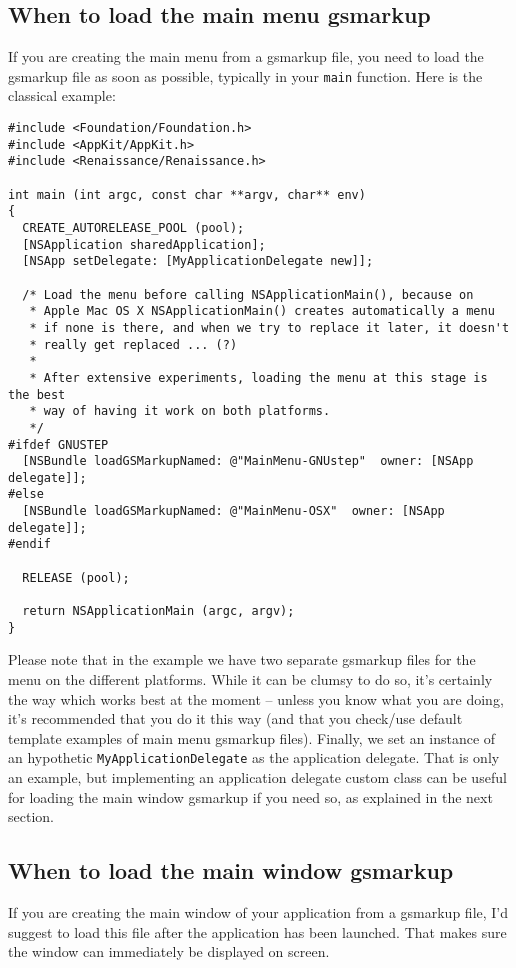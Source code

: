 \subsection{When to load the main menu gsmarkup}\label{integrating-renaissance-menu}
If you are creating the main menu from a gsmarkup file, you need to
load the gsmarkup file as soon as possible, typically in your
\texttt{main} function.  Here is the classical example:
\begin{verbatim}
#include <Foundation/Foundation.h>
#include <AppKit/AppKit.h>
#include <Renaissance/Renaissance.h>

int main (int argc, const char **argv, char** env)
{
  CREATE_AUTORELEASE_POOL (pool);
  [NSApplication sharedApplication];
  [NSApp setDelegate: [MyApplicationDelegate new]];

  /* Load the menu before calling NSApplicationMain(), because on
   * Apple Mac OS X NSApplicationMain() creates automatically a menu
   * if none is there, and when we try to replace it later, it doesn't
   * really get replaced ... (?)
   *
   * After extensive experiments, loading the menu at this stage is the best
   * way of having it work on both platforms.
   */
#ifdef GNUSTEP
  [NSBundle loadGSMarkupNamed: @"MainMenu-GNUstep"  owner: [NSApp delegate]];
#else
  [NSBundle loadGSMarkupNamed: @"MainMenu-OSX"  owner: [NSApp delegate]];
#endif

  RELEASE (pool);

  return NSApplicationMain (argc, argv);
}
\end{verbatim}
Please note that in the example we have two separate gsmarkup files
for the menu on the different platforms.  While it can be clumsy to do
so, it's certainly the way which works best at the moment -- unless
you know what you are doing, it's recommended that you do it this way
(and that you check/use default template examples of main menu
gsmarkup files).  Finally, we set an instance of an hypothetic
\texttt{MyApplicationDelegate} as the application delegate.  
That is only an example, but implementing an application delegate
custom class can be useful for loading the main window gsmarkup if you
need so, as explained in the next section.

\subsection{When to load the main window gsmarkup}
If you are creating the main window of your application from a
gsmarkup file, I'd suggest to load this file after the application has
been launched.  That makes sure the window can immediately be
displayed on screen.


